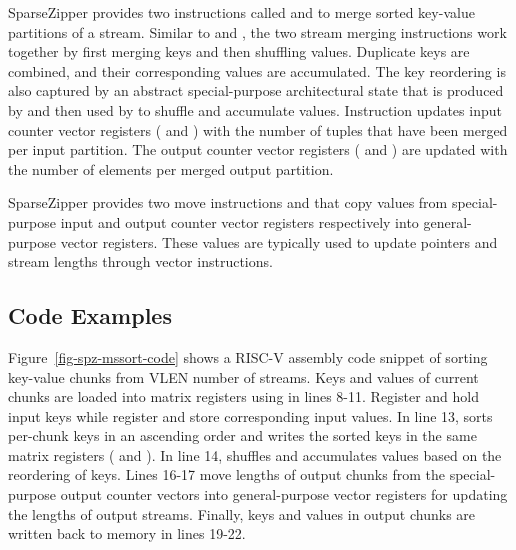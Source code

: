 SparseZipper provides two instructions called  and 
to merge sorted key-value partitions of a stream.
Similar to  and , the two stream merging
instructions work together by first merging keys and then shuffling values.
Duplicate keys are combined, and their corresponding values are accumulated.
The key reordering is also captured by an abstract special-purpose
architectural state that is produced by  and then used by
 to shuffle and accumulate values.
Instruction  updates input counter vector registers ( and
) with the number of tuples that have been merged per input partition.
The output counter vector registers ( and ) are updated with
the number of elements per merged output partition.

SparseZipper provides two move instructions  and  that
copy values from special-purpose input and output counter vector registers
respectively into general-purpose vector registers.
These values are typically used to update pointers and stream lengths through
vector instructions.

\subsection{Code Examples}


%
%


Figure~\ref{fig-spz-mssort-code} shows a \mbox{RISC-V} assembly code snippet of
sorting key-value chunks from VLEN number of streams.
Keys and values of current chunks are loaded into matrix registers using
 in lines 8-11.
Register  and  hold input keys while register  and
 store corresponding input values.
In line 13,  sorts per-chunk keys in an ascending order and
writes the sorted keys in the same matrix registers ( and ).
In line 14,  shuffles and accumulates values based on the
reordering of keys.
Lines 16-17 move lengths of output chunks from the special-purpose output
counter vectors into general-purpose vector registers for updating the lengths
of output streams.
Finally, keys and values in output chunks are written back to memory in lines
19-22.

